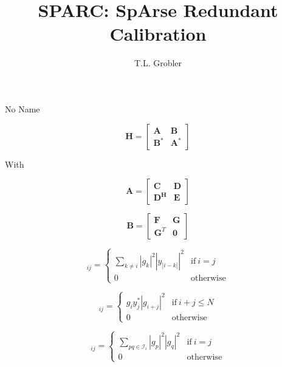 \documentclass[a4paper,10pt]{article}
\title{SPARC: SpArse Redundant Calibration}
\author{T.L. Grobler}
\begin{document}
\maketitle



\begin{section}{No Name}

\begin{equation}
\boldsymbol{H} = 
\begin{bmatrix}
\boldsymbol{A} & \boldsymbol{B}\\
\boldsymbol{B}^* & \boldsymbol{A}^*
\end{bmatrix}
\end{equation}

With 

\begin{equation}
\boldsymbol{A} = 
\begin{bmatrix}
\boldsymbol{C} & \boldsymbol{D}\\
\boldsymbol{D^H} & \boldsymbol{E}
\end{bmatrix}
\end{equation}

\begin{equation}
\boldsymbol{B} = 
\begin{bmatrix}
\boldsymbol{F} & \boldsymbol{G}\\
\boldsymbol{G}^T & \boldsymbol{0}
\end{bmatrix}
\end{equation}

\begin{equation}
[\boldsymbol{C}]_{ij} = 
\begin{cases}
 \sum_{k \neq i} \left | g_k \right |^2 \left | y_{|i-k|} \right |^2 & \textrm{if} ~ i=j\\
 0 & \textrm{otherwise}
\end{cases}
\end{equation}

\begin{equation}
[\boldsymbol{D}]_{ij} = 
\begin{cases}
 g_i y_j^*  \left | g_{i+j} \right |^2  & \textrm{if} ~ i+j \leq N\\
 0 & \textrm{otherwise}
\end{cases}
\end{equation}

\begin{equation}
[\boldsymbol{E}]_{ij} = 
\begin{cases}
 \sum_{pq \in \mathcal{I}_i} \left | g_p \right |^2 \left | g_q \right |^2  & \textrm{if} ~ i=j\\
 0 & \textrm{otherwise}
\end{cases}
\end{equation}


\end{section}
\end{document}
